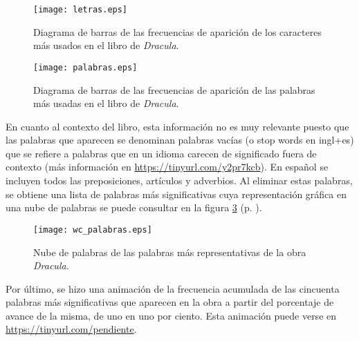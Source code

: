\documentclass[paper=leter, fontsize=11pt]{scrartcl}
\numberwithin{equation}{section}		%
\numberwithin{figure}{section}			%
\numberwithin{table}{section}				%
\begin{document}
\begin{figure}
    \centering
    \texttt{[image: letras.eps]}
    \caption{Diagrama de barras de las frecuencias de aparición de los caracteres más usados en el libro de \textit{Dracula}.}
    \label{letras}
\end{figure}

\begin{figure}
    \centering
    \texttt{[image: palabras.eps]}
    \caption{Diagrama de barras de las frecuencias de aparición de las palabras más usadas en el libro de \textit{Dracula}.}
    \label{palabras}
\end{figure}

En cuanto al contexto del libro, esta información no es muy relevante puesto que las palabras que aparecen se denominan palabras vacías (o stop words en ingl+es) que se refiere a palabras que en un idioma carecen de significado fuera de contexto (más información en \url{https://tinyurl.com/y2pr7kcb}). En español se incluyen todos las preposiciones, artículos y adverbios. Al eliminar estas palabras, se obtiene una lista de palabras más significativas cuya representación gráfica en una nube de palabras se puede consultar en la figura \ref{wc_palabras} (p. \pageref{wc_palabras}).

\begin{figure}
    \centering
    \texttt{[image: wc\_palabras.eps]}
    \caption{Nube de palabras de las palabras más representativas de la obra \textit{Dracula}.}
    \label{wc_palabras}
\end{figure}

Por último, se hizo una animación de la frecuencia acumulada de las cincuenta palabras más significativas que aparecen en la obra a partir del porcentaje de avance de la misma, de uno en uno por ciento. Esta animación puede verse en \url{https://tinyurl.com/pendiente}.



\end{document}
